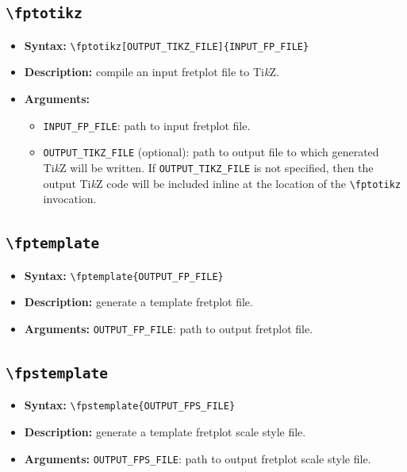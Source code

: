 \documentclass[12pt,letterpaper]{article}
\begin{document}
\subsection{\texttt{\textbackslash fptotikz}}

\begin{itemize}
  \item[] \textbf{\color{blue} Syntax:} \texttt{\textbackslash fptotikz[OUTPUT\_TIKZ\_FILE]\{INPUT\_FP\_FILE\}}
  \item[] \textbf{\color{blue} Description:} compile an input fretplot file to Ti\textit{k}Z.
  \item[] \textbf{\color{blue} Arguments:}
    \begin{itemize}
      \item \texttt{INPUT\_FP\_FILE}: path to input fretplot file.
      \item \texttt{OUTPUT\_TIKZ\_FILE} (optional): path to output file to which generated Ti\textit{k}Z will be written. If \texttt{OUTPUT\_TIKZ\_FILE} is not specified, then the output Ti\textit{k}Z code will be included inline at the location of the \texttt{\textbackslash fptotikz} invocation.
    \end{itemize}
\end{itemize}

\subsection{\texttt{\textbackslash fptemplate}}

\begin{itemize}
  \item[] \textbf{\color{blue} Syntax:} \texttt{\textbackslash fptemplate\{OUTPUT\_FP\_FILE\}}
  \item[] \textbf{\color{blue} Description:} generate a template fretplot file.
  \item[] \textbf{\color{blue} Arguments:} \texttt{OUTPUT\_FP\_FILE}: path to output fretplot file.
\end{itemize}

\subsection{\texttt{\textbackslash fpstemplate}}

\begin{itemize}
  \item[] \textbf{\color{blue} Syntax:} \texttt{\textbackslash fpstemplate\{OUTPUT\_FPS\_FILE\}}
  \item[] \textbf{\color{blue} Description:} generate a template fretplot scale style file.
  \item[] \textbf{\color{blue} Arguments:} \texttt{OUTPUT\_FPS\_FILE}: path to output fretplot scale style file.
\end{itemize}
\end{document}
